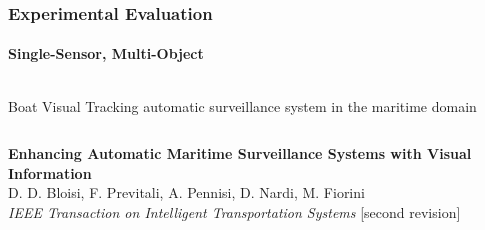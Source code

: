 \begin{frame}
	\frametitle{Experimental Evaluation}
	\framesubtitle{Single-Sensor, Multi-Object}
	
	\large
	
	\begin{columns}[t]
		{
			
			\begin{block}{Boat Visual Tracking}
				automatic surveillance system in the maritime domain
			\end{block}
			
		}
	\end{columns}
	
	\vspace{0.3cm}
	
	\begin{center}
	\end{center}
	
	\vspace{0.45cm}
	
	\tiny
	
	\textbf{Enhancing Automatic Maritime Surveillance Systems with Visual Information} \\
	D. D. Bloisi, F. Previtali, A. Pennisi, D. Nardi, M. Fiorini \\
	\emph{IEEE Transaction on Intelligent Transportation Systems} [second revision] \\
\end{frame}


